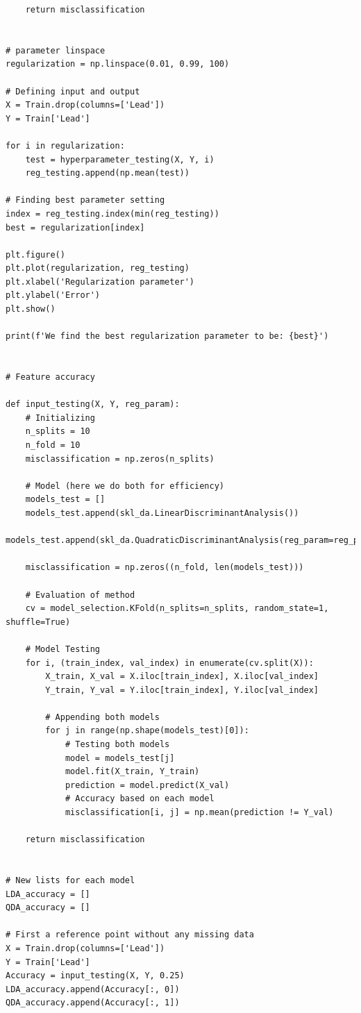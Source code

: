 \documentclass{article}
\begin{document}
\begin{verbatim}
    return misclassification


# parameter linspace
regularization = np.linspace(0.01, 0.99, 100)

# Defining input and output
X = Train.drop(columns=['Lead'])
Y = Train['Lead']

for i in regularization:
    test = hyperparameter_testing(X, Y, i)
    reg_testing.append(np.mean(test))

# Finding best parameter setting
index = reg_testing.index(min(reg_testing))
best = regularization[index]

plt.figure()
plt.plot(regularization, reg_testing)
plt.xlabel('Regularization parameter')
plt.ylabel('Error')
plt.show()

print(f'We find the best regularization parameter to be: {best}')


# Feature accuracy

def input_testing(X, Y, reg_param):
    # Initializing
    n_splits = 10
    n_fold = 10
    misclassification = np.zeros(n_splits)

    # Model (here we do both for efficiency)
    models_test = []
    models_test.append(skl_da.LinearDiscriminantAnalysis())
    models_test.append(skl_da.QuadraticDiscriminantAnalysis(reg_param=reg_param))

    misclassification = np.zeros((n_fold, len(models_test)))

    # Evaluation of method
    cv = model_selection.KFold(n_splits=n_splits, random_state=1, shuffle=True)

    # Model Testing
    for i, (train_index, val_index) in enumerate(cv.split(X)):
        X_train, X_val = X.iloc[train_index], X.iloc[val_index]
        Y_train, Y_val = Y.iloc[train_index], Y.iloc[val_index]

        # Appending both models
        for j in range(np.shape(models_test)[0]):
            # Testing both models
            model = models_test[j]
            model.fit(X_train, Y_train)
            prediction = model.predict(X_val)
            # Accuracy based on each model
            misclassification[i, j] = np.mean(prediction != Y_val)

    return misclassification


# New lists for each model
LDA_accuracy = []
QDA_accuracy = []

# First a reference point without any missing data
X = Train.drop(columns=['Lead'])
Y = Train['Lead']
Accuracy = input_testing(X, Y, 0.25)
LDA_accuracy.append(Accuracy[:, 0])
QDA_accuracy.append(Accuracy[:, 1])


\end{verbatim}
\end{document}
